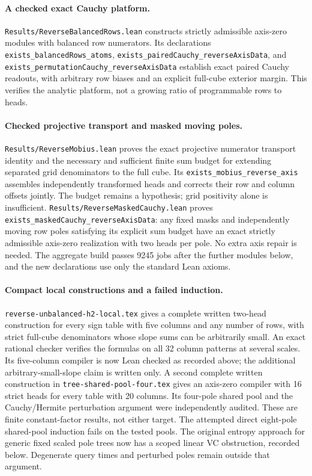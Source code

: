 \documentclass[11pt]{article}
\begin{document}
\paragraph{A checked exact Cauchy platform.}
\texttt{Results/ReverseBalancedRows.lean} constructs strictly admissible
axis-zero modules with balanced row numerators. Its declarations
\texttt{exists\_balancedRows\_atoms},
\texttt{exists\_pairedCauchy\_reverseAxisData}, and
\texttt{exists\_permutationCauchy\_reverseAxisData} establish exact paired
Cauchy readouts, with arbitrary row biases and an explicit full-cube
exterior margin. This verifies the analytic platform, not a growing
ratio of programmable rows to heads.

\paragraph{Checked projective transport and masked moving poles.}
\texttt{Results/ReverseMobius.lean} proves the exact projective
numerator transport identity and the necessary and sufficient finite
sum budget for extending separated grid denominators to the full cube.
Its \texttt{exists\_mobius\_reverse\_axis} assembles independently
transformed heads and corrects their row and column offsets jointly.
The budget remains a hypothesis; grid positivity alone is insufficient.
\texttt{Results/ReverseMaskedCauchy.lean} proves
\texttt{exists\_maskedCauchy\_reverseAxisData}: any fixed masks and
independently moving row poles satisfying its explicit sum budget have
an exact strictly admissible axis-zero realization with two heads per
pole. No extra axis repair is needed. The aggregate build passes
9245 jobs after the further modules below, and the new declarations use
only the standard Lean axioms.

\paragraph{Compact local constructions and a failed induction.}
\texttt{reverse-unbalanced-h2-local.tex} gives a complete written
two-head construction for every sign table with five columns and any
number of rows, with strict full-cube denominators whose slope sums
can be arbitrarily small. An exact rational checker verifies the formulas
on all 32 column patterns at several scales. Its five-column compiler
is now Lean checked as recorded above; the additional arbitrary-small-slope
claim is written only. A second complete written construction in
\texttt{tree-shared-pool-four.tex} gives an axis-zero compiler with
16 strict heads for every table with 20 columns. Its four-pole shared
pool and the Cauchy/Hermite perturbation argument were independently
audited. These are finite constant-factor results, not either target.
The attempted direct eight-pole shared-pool induction fails on the
tested pools. The original entropy approach for generic fixed scaled
pole trees now has a scoped linear VC obstruction, recorded below.
Degenerate query times and perturbed poles remain outside that argument.
\end{document}
